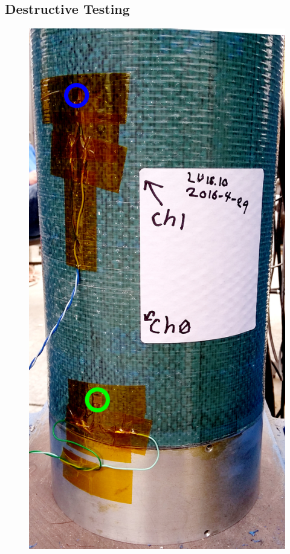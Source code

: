 \documentclass{aiaa-tc}%
\begin{document}
\subsection{Destructive Testing}\label{sec:test}
\label{sec:testing}

\begin{figure}[t]
	\centering
	\parbox{0.35\linewidth}
	{
		\centering
		\includegraphics[width=\linewidth]{../img/LU16-10crush_close.jpg}
}
\end{figure}
\end{document}
